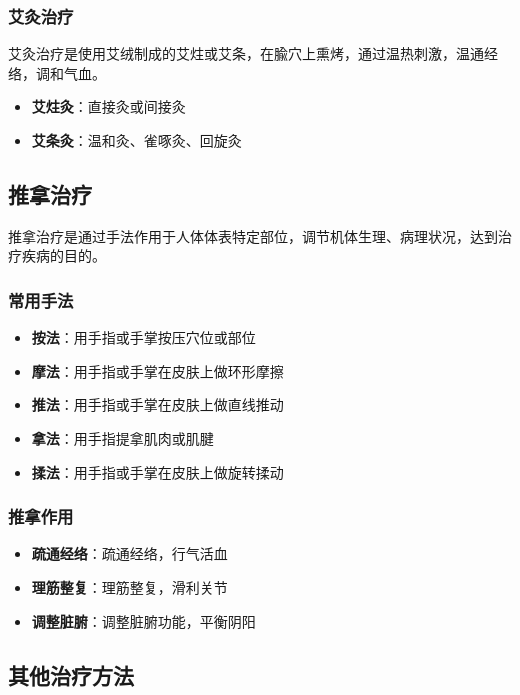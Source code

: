 \documentclass[12pt,UTF8]{ctexbook}
\begin{document}
\subsubsection{艾灸治疗}

艾灸治疗是使用艾绒制成的艾炷或艾条，在腧穴上熏烤，通过温热刺激，温通经络，调和气血。

\begin{itemize}
\item \textbf{艾炷灸}：直接灸或间接灸
\item \textbf{艾条灸}：温和灸、雀啄灸、回旋灸
\end{itemize}

\subsection{推拿治疗}

推拿治疗是通过手法作用于人体体表特定部位，调节机体生理、病理状况，达到治疗疾病的目的。

\subsubsection{常用手法}

\begin{itemize}
\item \textbf{按法}：用手指或手掌按压穴位或部位
\item \textbf{摩法}：用手指或手掌在皮肤上做环形摩擦
\item \textbf{推法}：用手指或手掌在皮肤上做直线推动
\item \textbf{拿法}：用手指提拿肌肉或肌腱
\item \textbf{揉法}：用手指或手掌在皮肤上做旋转揉动
\end{itemize}

\subsubsection{推拿作用}

\begin{itemize}
\item \textbf{疏通经络}：疏通经络，行气活血
\item \textbf{理筋整复}：理筋整复，滑利关节
\item \textbf{调整脏腑}：调整脏腑功能，平衡阴阳
\end{itemize}

\subsection{其他治疗方法}
\end{document}
